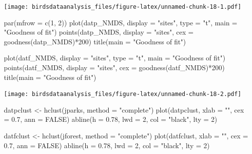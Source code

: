 \documentclass[
]{article}
\newenvironment{Shaded}{\begin{snugshade}}{\end{snugshade}}
\newcommand{\AttributeTok}[1]{\textcolor[rgb]{0.77,0.63,0.00}{#1}}
\newcommand{\ConstantTok}[1]{\textcolor[rgb]{0.00,0.00,0.00}{#1}}
\newcommand{\DecValTok}[1]{\textcolor[rgb]{0.00,0.00,0.81}{#1}}
\newcommand{\FloatTok}[1]{\textcolor[rgb]{0.00,0.00,0.81}{#1}}
\newcommand{\FunctionTok}[1]{\textcolor[rgb]{0.00,0.00,0.00}{#1}}
\newcommand{\NormalTok}[1]{#1}
\newcommand{\OtherTok}[1]{\textcolor[rgb]{0.56,0.35,0.01}{#1}}
\newcommand{\SpecialCharTok}[1]{\textcolor[rgb]{0.00,0.00,0.00}{#1}}
\newcommand{\StringTok}[1]{\textcolor[rgb]{0.31,0.60,0.02}{#1}}
\begin{document}
\texttt{[image: birdsdataanalysis\_files/figure-latex/unnamed-chunk-18-1.pdf]}

\begin{Shaded}
\begin{Highlighting}[]
\FunctionTok{par}\NormalTok{(}\AttributeTok{mfrow =} \FunctionTok{c}\NormalTok{(}\DecValTok{1}\NormalTok{, }\DecValTok{2}\NormalTok{))}
\FunctionTok{plot}\NormalTok{(datp\_NMDS, }\AttributeTok{display =} \StringTok{"sites"}\NormalTok{, }\AttributeTok{type =} \StringTok{"t"}\NormalTok{, }\AttributeTok{main =} \StringTok{"Goodness of fit"}\NormalTok{)}
\FunctionTok{points}\NormalTok{(datp\_NMDS, }\AttributeTok{display =} \StringTok{"sites"}\NormalTok{, }\AttributeTok{cex =} \FunctionTok{goodness}\NormalTok{(datp\_NMDS)}\SpecialCharTok{*}\DecValTok{200}\NormalTok{) }
\FunctionTok{title}\NormalTok{(}\AttributeTok{main =} \StringTok{"Goodness of fit"}\NormalTok{)}

\FunctionTok{plot}\NormalTok{(datf\_NMDS, }\AttributeTok{display =} \StringTok{"sites"}\NormalTok{, }\AttributeTok{type =} \StringTok{"t"}\NormalTok{, }\AttributeTok{main =} \StringTok{"Goodness of fit"}\NormalTok{)}
\FunctionTok{points}\NormalTok{(datf\_NMDS, }\AttributeTok{display =} \StringTok{"sites"}\NormalTok{, }\AttributeTok{cex =} \FunctionTok{goodness}\NormalTok{(datf\_NMDS)}\SpecialCharTok{*}\DecValTok{200}\NormalTok{) }
\FunctionTok{title}\NormalTok{(}\AttributeTok{main =} \StringTok{"Goodness of fit"}\NormalTok{)}
\end{Highlighting}
\end{Shaded}

\texttt{[image: birdsdataanalysis\_files/figure-latex/unnamed-chunk-18-2.pdf]}

\begin{Shaded}
\begin{Highlighting}[]
\NormalTok{datpclust }\OtherTok{\textless{}{-}} \FunctionTok{hclust}\NormalTok{(jparks, }\AttributeTok{method =} \StringTok{"complete"}\NormalTok{)}
\FunctionTok{plot}\NormalTok{(datpclust, }\AttributeTok{xlab =} \StringTok{""}\NormalTok{, }\AttributeTok{cex =} \FloatTok{0.7}\NormalTok{, }\AttributeTok{ann =} \ConstantTok{FALSE}\NormalTok{)}
\FunctionTok{abline}\NormalTok{(}\AttributeTok{h =} \FloatTok{0.78}\NormalTok{, }\AttributeTok{lwd =} \DecValTok{2}\NormalTok{, }\AttributeTok{col =} \StringTok{"black"}\NormalTok{, }\AttributeTok{lty =} \DecValTok{2}\NormalTok{)}

\NormalTok{datfclust }\OtherTok{\textless{}{-}} \FunctionTok{hclust}\NormalTok{(jforest, }\AttributeTok{method =} \StringTok{"complete"}\NormalTok{)}
\FunctionTok{plot}\NormalTok{(datfclust, }\AttributeTok{xlab =} \StringTok{""}\NormalTok{, }\AttributeTok{cex =} \FloatTok{0.7}\NormalTok{, }\AttributeTok{ann =} \ConstantTok{FALSE}\NormalTok{)}
\FunctionTok{abline}\NormalTok{(}\AttributeTok{h =} \FloatTok{0.78}\NormalTok{, }\AttributeTok{lwd =} \DecValTok{2}\NormalTok{, }\AttributeTok{col =} \StringTok{"black"}\NormalTok{, }\AttributeTok{lty =} \DecValTok{2}\NormalTok{)}
\end{Highlighting}
\end{Shaded}
\end{document}
